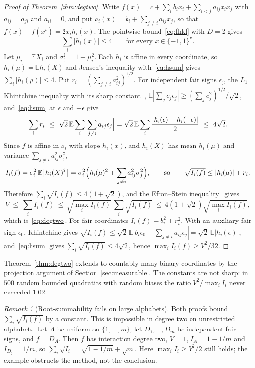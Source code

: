 \documentclass[11pt]{article}
\numberwithin{equation}{section}
\newcommand{\E}{\mathbb{E}}
\theoremstyle{plain}
\theoremstyle{remark}
\newtheorem{remark}[theorem]{Remark}
\begin{document}
\begin{proof}[Proof of Theorem~\ref{thm:degtwo}]
Write $f(x)=c+\sum_ib_ix_i+\sum_{i<j}a_{ij}x_ix_j$ with $a_{ij}=a_{ji}$ and $a_{ii}=0$, and put $h_i(x)=b_i+\sum_{j\ne i}a_{ij}x_j$, so that $f(x)-f(x^i)=2x_ih_i(x)$. The pointwise bound~\eqref{eq:fhkl} with $D=2$ gives
\begin{equation}\label{eq:hsum}
\sum_i|h_i(x)|\le4\qquad\text{for every }x\in\{-1,1\}^n .
\end{equation}
Let $\mu_i=\E X_i$ and $\sigma_i^2=1-\mu_i^2$. Each $h_i$ is affine in every coordinate, so $h_i(\mu)=\E h_i(X)$ and Jensen's inequality with~\eqref{eq:hsum} gives $\sum_i|h_i(\mu)|\le4$. Put $r_i=(\sum_{j\ne i}a_{ij}^2)^{1/2}$. For independent fair signs $\epsilon_j$, the $L_1$ Khintchine inequality with its sharp constant~\cite{Sza76}, $\E|\sum_jc_j\epsilon_j|\ge(\sum_jc_j^2)^{1/2}/\sqrt2$, and~\eqref{eq:hsum} at $\epsilon$ and $-\epsilon$ give
\[
\sum_ir_i\ \le\ \sqrt2\,\E\sum_i\Bigl|\sum_{j\ne i}a_{ij}\epsilon_j\Bigr|
=\sqrt2\,\E\sum_i\frac{|h_i(\epsilon)-h_i(-\epsilon)|}{2}\ \le\ 4\sqrt2 .
\]
Since $f$ is affine in $x_i$ with slope $h_i(x)$, and $h_i(X)$ has mean $h_i(\mu)$ and variance $\sum_{j\ne i}a_{ij}^2\sigma_j^2$,
\[
I_i(f)=\sigma_i^2\,\E\bigl[h_i(X)^2\bigr]=\sigma_i^2\Bigl(h_i(\mu)^2+\sum_{j\ne i}a_{ij}^2\sigma_j^2\Bigr),
\qquad\text{so}\qquad \sqrt{I_i(f)}\le|h_i(\mu)|+r_i .
\]
Therefore $\sum_i\sqrt{I_i(f)}\le4(1+\sqrt2)$, and the Efron--Stein inequality~\cite{ES81} gives
\[
V\ \le\ \sum_iI_i(f)\ \le\ \sqrt{\max_iI_i(f)}\ \sum_i\sqrt{I_i(f)}\ \le\ 4(1+\sqrt2)\sqrt{\max_iI_i(f)} ,
\]
which is~\eqref{eq:degtwo}. For fair coordinates $I_i(f)=b_i^2+r_i^2$. With an auxiliary fair sign $\epsilon_0$, Khintchine gives $\sqrt{I_i(f)}\le\sqrt2\,\E|b_i\epsilon_0+\sum_{j\ne i}a_{ij}\epsilon_j|=\sqrt2\,\E|h_i(\epsilon)|$, and~\eqref{eq:hsum} gives $\sum_i\sqrt{I_i(f)}\le4\sqrt2$, hence $\max_iI_i(f)\ge V^2/32$.
\end{proof}
Theorem~\ref{thm:degtwo} extends to countably many binary coordinates by the projection argument of Section~\ref{sec:measurable}. The constants are not sharp: in $500$ random bounded quadratics with random biases the ratio $V^2/\max_iI_i$ never exceeded $1.02$.

\begin{remark}[Root-summability fails on large alphabets]\label{rem:rootsum}
Both proofs bound $\sum_i\sqrt{I_i(f)}$ by a constant. This is impossible in degree two on unrestricted alphabets. Let $A$ be uniform on $\{1,\dots,m\}$, let $D_1,\dots,D_m$ be independent fair signs, and $f=D_A$. Then $f$ has interaction degree two, $V=1$, $I_A=1-1/m$ and $I_{D_j}=1/m$, so $\sum_i\sqrt{I_i}=\sqrt{1-1/m}+\sqrt m$. Here $\max_iI_i\ge V^2/2$ still holds; the example obstructs the method, not the conclusion.
\end{remark}
\end{document}

